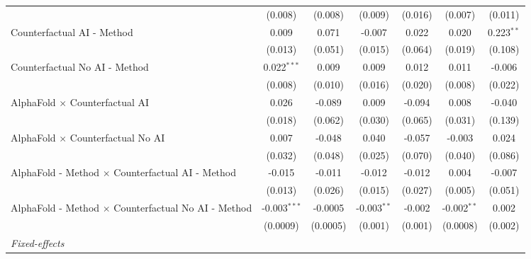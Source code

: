 \begin{tabular}{lcccccc}
                                                              & (0.008)        & (0.008)       & (0.009)       & (0.016)      & (0.007)       & (0.011)\\   
   Counterfactual AI - Method                                 & 0.009          & 0.071         & -0.007        & 0.022        & 0.020         & 0.223$^{**}$\\   
                                                              & (0.013)        & (0.051)       & (0.015)       & (0.064)      & (0.019)       & (0.108)\\   
   Counterfactual No AI - Method                              & 0.022$^{***}$  & 0.009         & 0.009         & 0.012        & 0.011         & -0.006\\   
                                                              & (0.008)        & (0.010)       & (0.016)       & (0.020)      & (0.008)       & (0.022)\\   
   AlphaFold $\times$ Counterfactual AI                       & 0.026          & -0.089        & 0.009         & -0.094       & 0.008         & -0.040\\   
                                                              & (0.018)        & (0.062)       & (0.030)       & (0.065)      & (0.031)       & (0.139)\\   
   AlphaFold $\times$ Counterfactual No AI                    & 0.007          & -0.048        & 0.040         & -0.057       & -0.003        & 0.024\\   
                                                              & (0.032)        & (0.048)       & (0.025)       & (0.070)      & (0.040)       & (0.086)\\   
   AlphaFold - Method $\times$ Counterfactual AI - Method     & -0.015         & -0.011        & -0.012        & -0.012       & 0.004         & -0.007\\   
                                                              & (0.013)        & (0.026)       & (0.015)       & (0.027)      & (0.005)       & (0.051)\\   
   AlphaFold - Method $\times$ Counterfactual No AI - Method  & -0.003$^{***}$ & -0.0005       & -0.003$^{**}$ & -0.002       & -0.002$^{**}$ & 0.002\\   
                                                              & (0.0009)       & (0.0005)      & (0.001)       & (0.001)      & (0.0008)      & (0.002)\\   
   \midrule
   \emph{Fixed-effects}\\

\end{tabular}
